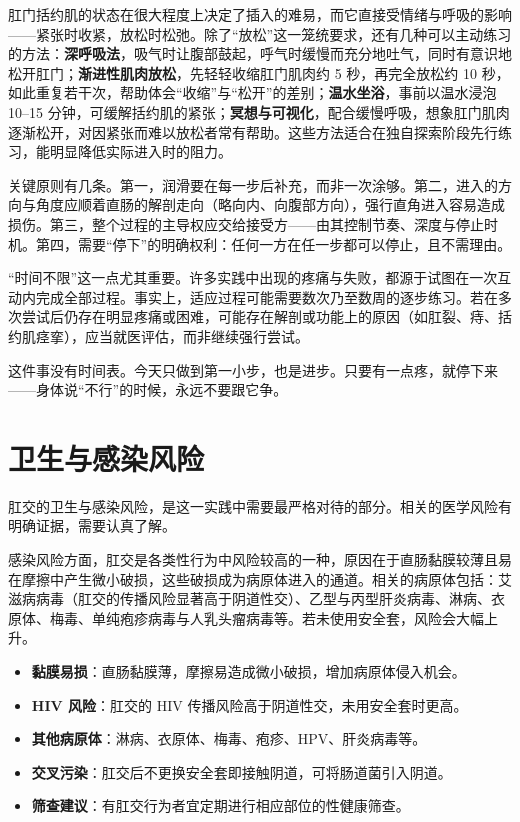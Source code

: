 \documentclass[12pt,UTF8]{ctexbook}
\newcommand{\keyword}[1]{\textbf{#1}}
\begin{document}
肛门括约肌的状态在很大程度上决定了插入的难易，而它直接受情绪与呼吸的影响——紧张时收紧，放松时松弛。除了“放松”这一笼统要求，还有几种可以主动练习的方法：\keyword{深呼吸法}，吸气时让腹部鼓起，呼气时缓慢而充分地吐气，同时有意识地松开肛门；\keyword{渐进性肌肉放松}，先轻轻收缩肛门肌肉约 5 秒，再完全放松约 10 秒，如此重复若干次，帮助体会“收缩”与“松开”的差别；\keyword{温水坐浴}，事前以温水浸泡 10--15 分钟，可缓解括约肌的紧张；\keyword{冥想与可视化}，配合缓慢呼吸，想象肛门肌肉逐渐松开，对因紧张而难以放松者常有帮助。这些方法适合在独自探索阶段先行练习，能明显降低实际进入时的阻力。

关键原则有几条。第一，润滑要在每一步后补充，而非一次涂够。第二，进入的方向与角度应顺着直肠的解剖走向（略向内、向腹部方向），强行直角进入容易造成损伤。第三，整个过程的主导权应交给接受方——由其控制节奏、深度与停止时机。第四，需要“停下”的明确权利：任何一方在任一步都可以停止，且不需理由。

“时间不限”这一点尤其重要。许多实践中出现的疼痛与失败，都源于试图在一次互动内完成全部过程。事实上，适应过程可能需要数次乃至数周的逐步练习。若在多次尝试后仍存在明显疼痛或困难，可能存在解剖或功能上的原因（如肛裂、痔、括约肌痉挛），应当就医评估，而非继续强行尝试。

\begin{tcolorbox}[colback=pink!5!white,colframe=red!50!black,title=贴心小叮咛]
这件事没有时间表。今天只做到第一小步，也是进步。只要有一点疼，就停下来——身体说“不行”的时候，永远不要跟它争。
\end{tcolorbox}

\section{卫生与感染风险}

肛交的卫生与感染风险，是这一实践中需要最严格对待的部分。相关的医学风险有明确证据，需要认真了解。

感染风险方面，肛交是各类性行为中风险较高的一种，原因在于直肠黏膜较薄且易在摩擦中产生微小破损，这些破损成为病原体进入的通道。相关的病原体包括：艾滋病病毒（肛交的传播风险显著高于阴道性交）、乙型与丙型肝炎病毒、淋病、衣原体、梅毒、单纯疱疹病毒与人乳头瘤病毒等。若未使用安全套，风险会大幅上升。

\begin{itemize}
\item \textbf{黏膜易损}：直肠黏膜薄，摩擦易造成微小破损，增加病原体侵入机会。
\item \textbf{HIV 风险}：肛交的 HIV 传播风险高于阴道性交，未用安全套时更高。
\item \textbf{其他病原体}：淋病、衣原体、梅毒、疱疹、HPV、肝炎病毒等。
\item \textbf{交叉污染}：肛交后不更换安全套即接触阴道，可将肠道菌引入阴道。
\item \textbf{筛查建议}：有肛交行为者宜定期进行相应部位的性健康筛查。
\end{itemize}
\end{document}
